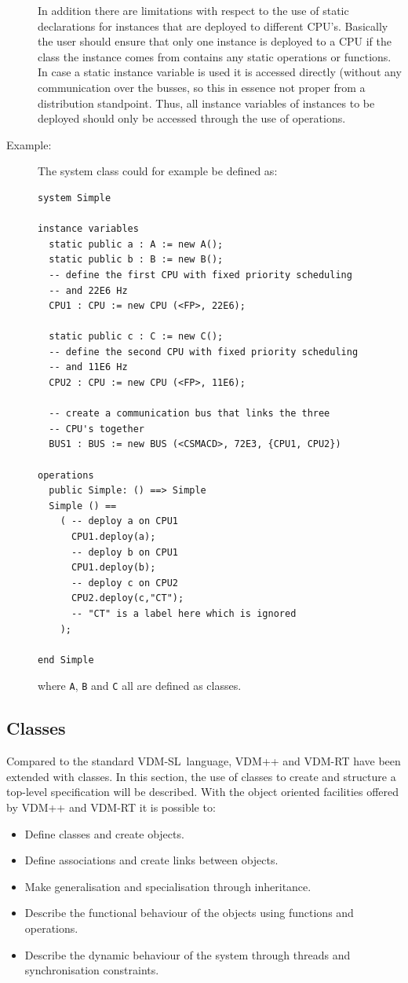 \documentclass{overturerepchap}
\begin{document}
\begin{description}
In addition there are limitations with respect to the use of static
declarations for instances that are deployed to different
CPU's. Basically the user should ensure that only one instance is
deployed to a CPU if the class the instance comes from contains any
static operations or functions. In case a static instance variable is
used it is accessed directly (without any communication over the
busses, so this in essence not proper from a distribution
standpoint. Thus, all instance variables of instances to be deployed
should only be accessed through the use of operations.

\item[Example:] The system class could for example be defined as:
\begin{lstlisting}
system Simple

instance variables
  static public a : A := new A();
  static public b : B := new B();
  -- define the first CPU with fixed priority scheduling 
  -- and 22E6 Hz
  CPU1 : CPU := new CPU (<FP>, 22E6);

  static public c : C := new C();
  -- define the second CPU with fixed priority scheduling 
  -- and 11E6 Hz
  CPU2 : CPU := new CPU (<FP>, 11E6);

  -- create a communication bus that links the three 
  -- CPU's together
  BUS1 : BUS := new BUS (<CSMACD>, 72E3, {CPU1, CPU2})

operations
  public Simple: () ==> Simple
  Simple () ==
    ( -- deploy a on CPU1
      CPU1.deploy(a);
      -- deploy b on CPU1
      CPU1.deploy(b);
      -- deploy c on CPU2
      CPU2.deploy(c,"CT"); 
      -- "CT" is a label here which is ignored
    );

end Simple
\end{lstlisting} 
\noindent where \texttt{A}, \texttt{B} and \texttt{C} all are defined
as classes.
\end{description}

\subsection{Classes}
\label{sec:classdep}

Compared to the standard VDM-SL\ language, VDM++ and VDM-RT have been
extended with classes. In this section, the use of classes to create
and structure a top-level specification will be described. With the
object oriented facilities offered by VDM++ and VDM-RT it is possible to:

\begin{itemize}
\item Define classes and create objects.
\item Define associations and create links between objects.
\item Make generalisation and specialisation through inheritance.
\item Describe the functional behaviour of the objects using functions
  and operations.
\item Describe the dynamic behaviour of the system through threads and
  synchronisation constraints.
\end{itemize}
\end{document}
